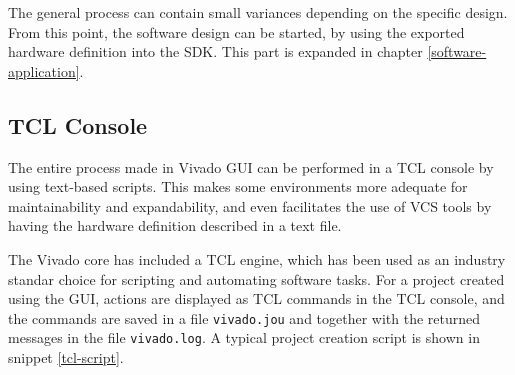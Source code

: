 The general process can contain small variances depending on the specific design. From this point,
the software design can be started, by using the exported hardware definition into the SDK. This
part is expanded in chapter \ref{software-application}.

\subsection{TCL Console}

The entire process made in Vivado GUI can be performed in a TCL console by using text-based scripts.
This makes some environments more adequate for maintainability and expandability, and even
facilitates the use of VCS tools by having the hardware definition described in a text file.

The Vivado core has included a TCL engine, which has been used as an industry standar choice for
scripting and automating software tasks. For a project created using the GUI, actions are displayed
as TCL commands in the TCL console, and the commands are saved in a file \texttt{vivado.jou} and
together with the returned messages in the file \texttt{vivado.log}. A typical project creation
script is shown in snippet \ref{tcl-script}.

